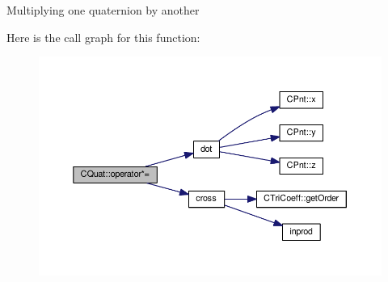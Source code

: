 Multiplying one quaternion by another 

Here is the call graph for this function\-:
\nopagebreak
\begin{figure}[H]
\begin{center}
\leavevmode
\includegraphics[width=350pt]{classCQuat_a91a9f75dd706a025a68121522d30a561_cgraph}
\end{center}
\end{figure}



